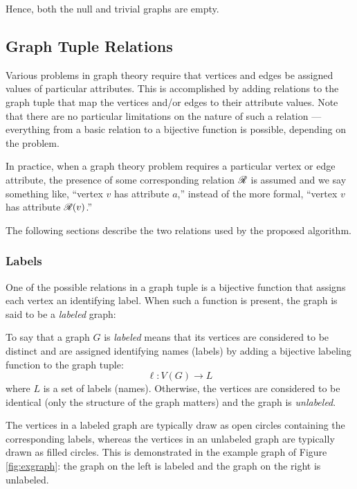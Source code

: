 Hence, both the null and trivial graphs are empty.

\subsection{Graph Tuple Relations}

Various problems in graph theory require that vertices and edges be assigned values of particular attributes.  This
is accomplished by adding relations to the graph tuple that map the vertices and/or edges to their attribute values.
Note that there are no particular limitations on the nature of such a relation --- everything from a basic relation
to a bijective function is possible, depending on the problem.

In practice, when a graph theory problem requires a particular vertex or edge attribute, the presence of some
corresponding relation \(\mathscr{R}\) is assumed and we say something like, ``vertex \(v\) has attribute \(a\),'' instead
of the more formal, ``vertex \(v\) has attribute \(\mathscr{R}(v)\).''

The following sections describe the two relations used by the proposed algorithm.

\subsubsection{Labels}

One of the possible relations in a graph tuple is a bijective function that assigns each vertex an identifying label.
When such a function is present, the graph is said to be a \emph{labeled} graph:

\begin{definition}
  To say that a graph \(G\) is \emph{labeled} means that its vertices are considered to be distinct and are
  assigned identifying names (labels) by adding a bijective labeling function to the graph tuple:
  \[\ell:V(G)\to L\]
  where \(L\) is a set of labels (names).  Otherwise, the vertices are considered to be identical (only the
  structure of the graph matters) and the graph is \emph{unlabeled}.
\end{definition}

The vertices in a labeled graph are typically draw as open circles containing the corresponding labels, whereas the
vertices in an unlabeled graph are typically drawn as filled circles.  This is demonstrated in the example graph of
Figure \ref{fig:exgraph}: the graph on the left is labeled and the graph on the right is unlabeled.

